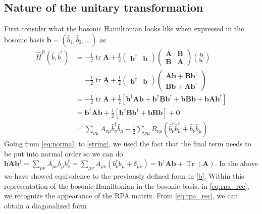 \subsection{Nature of the unitary transformation}
First consider what the bosonic Hamiltonian looks like when expressed in the bosonic basis $\bm{{b}} = \left( \hat{b}_1, \hat{b}_2, \ldots \right)$ as
\begin{align}
\hat{H}^{\mathrm{B}}\left(\hat{b}, \hat{b}^{\dagger}\right)&=-\frac{1}{2} \operatorname{tr} \mathbf{A}+\frac{1}{2}\left(\begin{array}{ll}
\mathbf{b}^{\dagger} & \mathbf{b}
\end{array}\right)\left(\begin{array}{ll}
\mathbf{A} & \mathbf{B} \\
\mathbf{B} & \mathbf{A}
\end{array}\right)\binom{\mathbf{b}}{\mathbf{b}^{\dagger}}
\label{eq:rpa_rec}
 \\
&=-\frac{1}{2} \operatorname{tr} \mathbf{A}+\frac{1}{2}\begin{pmatrix}\bm{b}^{\dagger}& \bm{b}\end{pmatrix}\begin{pmatrix}
    \bm{A}\bm{b} + \bm{B}\bm{b}^{\dagger} \\
    \bm{B}\bm{b} + \bm{A}\bm{b}^{\dagger}
\end{pmatrix} \\
&=-\frac{1}{2} \operatorname{tr} \mathbf{A}+\frac{1}{2}\left[\bm{b}^{\dagger} \bm{A} \bm{b} + \bm{b}^{\dagger} \bm{B} \bm{b}^{\dagger} + \bm{b} \bm{B} \bm{b} + \bm{b} \bm{A} \bm{b}^{\dagger}\right]
\label{eq:normal}
 \\
&=\bm{b}^{\dagger} \bm{A} \bm{b} + \frac{1}{2}\left[\bm{b}^{\dagger} \bm{B} \bm{b}^{\dagger} + \bm{b} \bm{B} \bm{b}\right] + \bm{0}
\label{string}\\
&=\sum_{\nu \mu} A_{\nu \mu} \hat{b}_\nu^{\dagger} \hat{b}_\mu+\frac{1}{2} \sum_{\nu \mu} B_{\nu \mu}\left(\hat{b}_\nu^{\dagger} \hat{b}_\mu^{\dagger}+\hat{b}_\nu \hat{b}_\mu\right)
\end{align}
Going from \ref{eq:normal} to \ref{string}, we used the fact that the final term needs to be put into normal order so we can do $\bm{b} \bm{A} \bm{b}^{\dagger}=\sum_{\mu\nu}A_{\mu\nu}b_\mu b_\nu^{\dagger}= \sum_{\mu\nu}A_{\mu\nu}\left(b_\nu^\dagger b_\mu + \delta_{\mu\nu}\right) = \bm{b}^\dagger \bm{A} \bm{b} + \operatorname{Tr}\left(\bm{A}\right)$. In the above we have showed equivalence to the previously defined form in \ref{b}.  Within this representation of the bosonic Hamiltonian in the bosonic basis, in \ref{eq:rpa_rec}, we recognize the appearance of the RPA matrix. From \ref{eq:rpa_rec}, we can obtain a diagonalized form 
